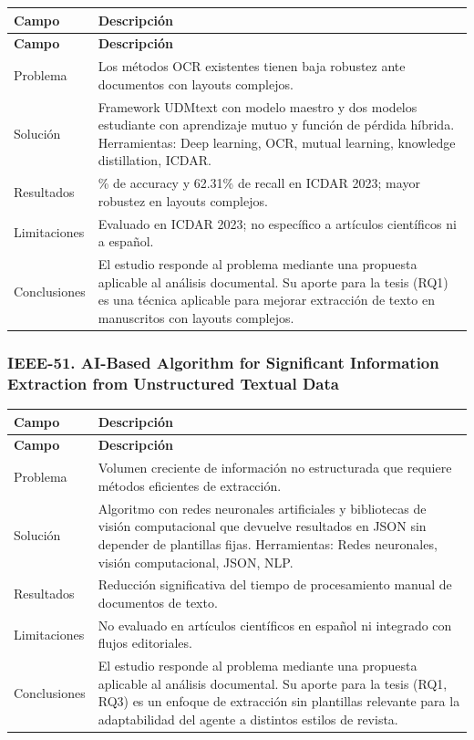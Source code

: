 \begin{longtable}{@{}>{\raggedright\arraybackslash}p{}>{\raggedright\arraybackslash}p{}@{}}
\toprule
\textbf{Campo} & \textbf{Descripción} \\
\midrule
\endfirsthead
\toprule
\textbf{Campo} & \textbf{Descripción} \\
\midrule
\endhead
\bottomrule
\endfoot
\endlastfoot
Problema & Los métodos OCR existentes tienen baja robustez ante documentos con layouts complejos. \\
Solución & Framework UDMtext con modelo maestro y dos modelos estudiante con aprendizaje mutuo y función de pérdida híbrida. Herramientas: Deep learning, OCR, mutual learning, knowledge distillation, ICDAR. \\
Resultados & 72.91\% de accuracy y 62.31\% de recall en ICDAR 2023; mayor robustez en layouts complejos. \\
Limitaciones & Evaluado en ICDAR 2023; no específico a artículos científicos ni a español. \\
Conclusiones & El estudio responde al problema mediante una propuesta aplicable al análisis documental. Su aporte para la tesis (RQ1) es una técnica aplicable para mejorar extracción de texto en manuscritos con layouts complejos. \\
\end{longtable}

\subsubsection*{IEEE-51. AI-Based Algorithm for Significant Information Extraction from Unstructured Textual Data}

\begin{longtable}{@{}>{\raggedright\arraybackslash}p{}>{\raggedright\arraybackslash}p{}@{}}
\toprule
\textbf{Campo} & \textbf{Descripción} \\
\midrule
\endfirsthead
\toprule
\textbf{Campo} & \textbf{Descripción} \\
\midrule
\endhead
\bottomrule
\endfoot
\endlastfoot
Problema & Volumen creciente de información no estructurada que requiere métodos eficientes de extracción. \\
Solución & Algoritmo con redes neuronales artificiales y bibliotecas de visión computacional que devuelve resultados en JSON sin depender de plantillas fijas. Herramientas: Redes neuronales, visión computacional, JSON, NLP. \\
Resultados & Reducción significativa del tiempo de procesamiento manual de documentos de texto. \\
Limitaciones & No evaluado en artículos científicos en español ni integrado con flujos editoriales. \\
Conclusiones & El estudio responde al problema mediante una propuesta aplicable al análisis documental. Su aporte para la tesis (RQ1, RQ3) es un enfoque de extracción sin plantillas relevante para la adaptabilidad del agente a distintos estilos de revista. \\
\end{longtable}

